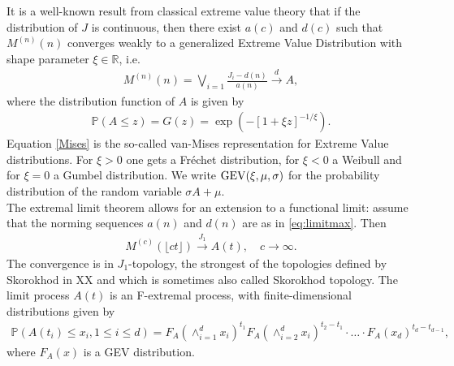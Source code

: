 \documentclass[12pt]{article}
\newcommand{\PP}{\mathbb{P}}
\newcommand{\1}{\mathbf 1}
\begin{document}
It is a well-known result from classical extreme value theory that if the distribution of $J$ is continuous, then there exist $a(c)$ and $d(c)$ such that  $M^{(n)}(n)$ converges weakly to a generalized Extreme Value Distribution with shape parameter $\xi \in \mathbb R$, i.e.
\begin{align}
M^{(n)}(n) = \bigvee_{i=1}{\frac{J_i - d(n)}{a(n)}}\stackrel{d}{\to} A, \label{eq:limitmax}
\end{align}
where the distribution function of $A$ is given by
\begin{align}
\PP(A \le z) = G(z) = \exp\left(-[1+\xi z]^{-1/\xi}\right). \label{Mises}
\end{align}
Equation \eqref{Mises} is the so-called van-Mises representation for Extreme Value distributions. For $\xi>0$ one gets a Fr\'echet distribution, for $\xi<0$ a Weibull and for $\xi=0$ a Gumbel distribution. We write ${\rm GEV}(\xi, \mu, \sigma)$ for the probability distribution of the random variable $\sigma A + \mu$. \\
The extremal limit theorem allows for an extension to a functional limit: assume that the norming sequences $a(n)$ and $d(n)$ are as in \eqref{eq:limitmax}. Then 
\begin{align*}
M^{(c)}(\lfloor ct \rfloor)
\stackrel{J_1}{\to} A(t),
\quad c \to \infty.
\end{align*}
The convergence is in $J_1$-topology, the strongest of the topologies defined by Skorokhod in XX and which is sometimes also called Skorokhod topology. The limit process $A(t)$ is an F-extremal process, with finite-dimensional distributions given by
\begin{align*}
\PP(A(t_i)\leq x_i,1\leq i \leq d) = F_A(\wedge_{i=1}^d x_i)^{t_1}  F_A(\wedge_{i=2}^d x_i)^{t_2-t_1} \cdot \ldots \cdot F_A(x_d)^{t_d-t_{d-1}},
\end{align*}
where $F_A(x)$ is a GEV distribution.
\end{document}
